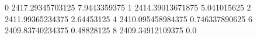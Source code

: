 0 2417.29345703125 7.9443359375
1 2414.39013671875 5.041015625
2 2411.99365234375 2.64453125
4 2410.095458984375 0.746337890625
6 2409.83740234375 0.48828125
8 2409.34912109375 0.0
